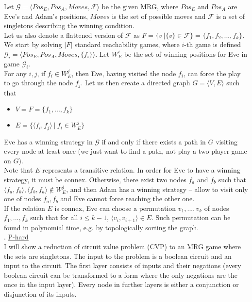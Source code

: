 \noindent
Let $\mathcal{G} = \langle Pos_E, Pos_A, Moves, \mathcal{F} \rangle$ be the given MRG, where
$Pos_E$ and $Pos_A$ are Eve's and Adam's positions, $Moves$ is the set
of possible moves and $\mathcal{F}$ is a set of singletons describing the winning condition.\\
Let us also denote a flattened version of $\mathcal{F}$ as $F = \{v\ | \{v\} \in \mathcal{F} \} = \{f_1, f_2, ..., f_k\}$.\\

\noindent
We start by solving $|F|$ standard reachability games, where $i$-th game is defined
$\mathcal{G}_i = \langle Pos_E, Pos_A, Moves, \{f_i\} \rangle$. Let $W_E^i$ be the set of winning positions for Eve
in game $\mathcal{G}_i$.\\
For any $i, j$, if $f_i \in W_E^j$, then Eve, having visited the node $f_i$, can force the play to go
through the node $f_j$. Let us then create a directed graph $G = \langle V, E \rangle$ such that
\begin{itemize}
      \item $V = F = \{f_1, ..., f_k\}$
      \item $E = \{ \langle f_i, f_j \rangle\ |\ f_i \in W_E^j \}$
\end{itemize}
Eve has a winning strategy in $\mathcal{G}$ if and only if there exists a path in $G$ visiting every node at least
once (we just want to find a path, not play a two-player game on $G$).\\
Note that $E$ represents a transitive relation. In order for Eve to have a winning strategy, it must be connex.
Otherwise, there exist two nodes $f_a$ and $f_b$ such that $\langle f_a, f_b \rangle, \langle f_b, f_a \rangle \not\in W_E^j$, and then Adam has
a winning strategy -- allow to visit only one of nodes $f_a, f_b$ and Eve cannot force reaching the other one.\\
If the relation $E$ is connex, Eve can choose a permutation $v_1, ..., v_k$ of nodes $f_1, ..., f_k$ such that
for all $i \leq k-1$, $\langle v_i, v_{i+1} \rangle \in E$. Such permutation can be found in polynomial time,
e.g. by topologically sorting the graph.\\

. \underline{P-hard}\\
I will show a reduction of circuit value problem (CVP) to an MRG game where the sets are singletons.
The input to the problem is a boolean circuit and an input to the circuit. The first layer consists of inputs
and their negations (every boolean circuit can be transformed to a form where the only negations are the once
in the input layer). Every node in further layers is either a conjunction or disjunction of its inputs.\\

